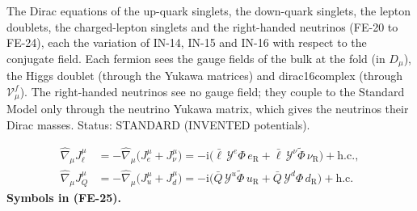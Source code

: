 \documentclass[
  10pt,
]{article}
\begin{document}
The Dirac equations of the up-quark singlets, the down-quark singlets,
the lepton doublets, the charged-lepton singlets and the right-handed
neutrinos (FE-20 to FE-24), each the variation of IN-14, IN-15 and IN-16
with respect to the conjugate field. Each fermion sees the gauge fields
of the bulk at the fold (in \(D_\mu\)), the Higgs doublet (through the
Yukawa matrices) and dirac16complex (through \(\mathcal{V}^{f}_\mu\)).
The right-handed neutrinos see no gauge field; they couple to the
Standard Model only through the neutrino Yukawa matrix, which gives the
neutrinos their Dirac masses. Status: STANDARD (INVENTED potentials).

\[
\begin{aligned}
\hat\nabla_\mu J_{\ell}^\mu &= -\hat\nabla_\mu\big(J_{e}^\mu + J_{\nu}^\mu\big)
 = -\mathrm{i}\big(\bar\ell\,\mathcal{Y}^{e}\Phi\,e_{\mathrm{R}} + \bar\ell\,\mathcal{Y}^{\nu}\tilde\Phi\,\nu_{\mathrm{R}}\big) + \mathrm{h.c.},\\
\hat\nabla_\mu J_{Q}^\mu &= -\hat\nabla_\mu\big(J_{u}^\mu + J_{d}^\mu\big)
 = -\mathrm{i}\big(\bar Q\,\mathcal{Y}^{u}\tilde\Phi\,u_{\mathrm{R}} + \bar Q\,\mathcal{Y}^{d}\Phi\,d_{\mathrm{R}}\big) + \mathrm{h.c.}
\end{aligned} \tag{FE-25}
\] \textbf{Symbols in (FE-25).}
\end{document}
